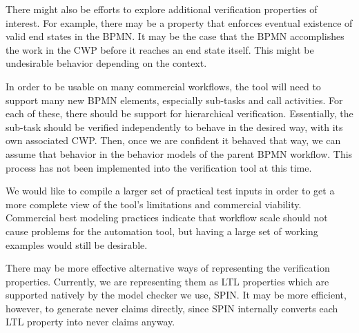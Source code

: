 There might also be efforts to explore additional verification properties of interest. For example, there may be a property that enforces eventual existence of valid end states in the BPMN. It may be the case that the BPMN accomplishes the work in the CWP before it reaches an end state itself. This might be undesirable behavior depending on the context.

In order to be usable on many commercial workflows, the tool will need to support many new BPMN elements, especially sub-tasks and call activities. For each of these, there should be support for hierarchical verification. Essentially, the sub-task should be verified independently to behave in the desired way, with its own associated CWP. Then, once we are confident it behaved that way, we can assume that behavior in the behavior models of the parent BPMN workflow. This process has not been implemented into the verification tool at this time.

We would like to compile a larger set of practical test inputs in order to get a more complete view of the tool's limitations and commercial viability. Commercial best modeling practices indicate that workflow scale should not cause problems for the automation tool, but having a large set of working examples would still be desirable.

There may be more effective alternative ways of representing the verification properties. Currently, we are representing them as LTL properties which are supported natively by the model checker we use, SPIN. It may be more efficient, however, to generate never claims directly, since SPIN internally converts each LTL property into never claims anyway.
